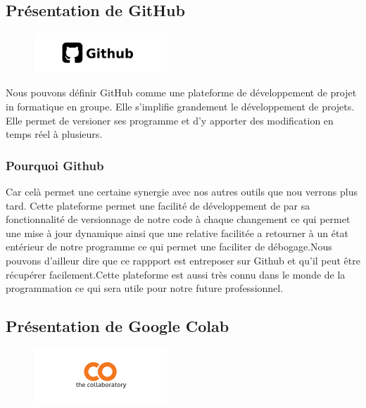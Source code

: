 \hypertarget{Pruxe9sentation-de-GitHub}{%
\subsection{Présentation de GitHub}
\label{Pruxe9sentation-de-GitHub}}

\begin{figure}[h]
  \begin{center}
  \includegraphics[width=5cm]{./images/github.jpg}
  \end{center}
\end{figure}

Nous pouvons définir GitHub comme une plateforme de développement de projet in formatique en groupe. Elle s'implifie grandement le développement de projets. Elle permet de versioner ses programme et d'y apporter des modification en temps réel à plusieurs.

\hypertarget{Pourquoi-Github}{%
\subsubsection{Pourquoi Github}
\label{Pourquoi-Github}}
Car celà permet une certaine synergie avec nos autres outils que nou verrons plus tard. Cette plateforme permet une facilité de développement de par sa fonctionnalité de versionnage de notre code à chaque changement ce qui permet une mise à jour dynamique ainsi que une relative facilitée a retourner à un état entérieur de notre programme ce qui permet une faciliter de débogage.Nous pouvons d'ailleur dire que ce rappport est entreposer sur Github et qu'il peut être récupérer facilement.Cette plateforme est aussi très connu dans le monde de la programmation ce qui sera utile pour notre future professionnel.

\hypertarget{Pruxe9sentation-de-Google-Colab}{%
\subsection{Présentation de Google Colab}
\label{Pruxe9sentation-de-Google-Colab}}

\begin{figure}[h]
\begin{center}
\includegraphics[width=5cm]{./images/Colab_logo.png}
\end{center}
\end{figure}

